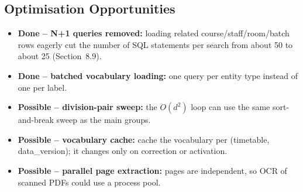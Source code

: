 \subsection{Optimisation Opportunities}
\begin{itemize}
\item \textbf{Done -- N+1 queries removed:} loading related course/staff/room/batch rows eagerly cut
      the number of SQL statements per search from about 50 to about 25 (Section~8.9).
\item \textbf{Done -- batched vocabulary loading:} one query per entity type instead of one per label.
\item \textbf{Possible -- division-pair sweep:} the $O(d^2)$ loop can use the same sort-and-break
      sweep as the main groups.
\item \textbf{Possible -- vocabulary cache:} cache the vocabulary per (timetable, data\_version); it
      changes only on correction or activation.
\item \textbf{Possible -- parallel page extraction:} pages are independent, so OCR of scanned PDFs
      could use a process pool.
\end{itemize}

\newpage
